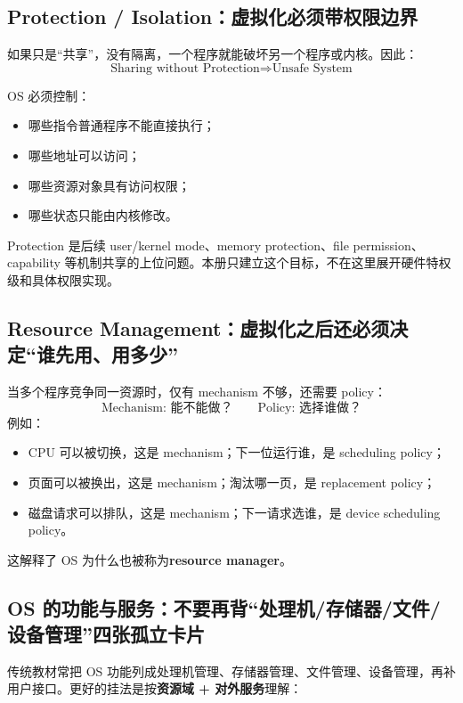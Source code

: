 \documentclass[11pt,a4paper]{ctexart}
\newcommand{\kw}[1]{\textbf{#1}}
\begin{document}
\subsection{Protection / Isolation：虚拟化必须带权限边界}

如果只是“共享”，没有隔离，一个程序就能破坏另一个程序或内核。因此：
\[
\boxed{\text{Sharing without Protection}\Rightarrow\text{Unsafe System}}
\]

OS 必须控制：
\begin{itemize}
  \item 哪些指令普通程序不能直接执行；
  \item 哪些地址可以访问；
  \item 哪些资源对象具有访问权限；
  \item 哪些状态只能由内核修改。
\end{itemize}

Protection 是后续 user/kernel mode、memory protection、file permission、capability 等机制共享的上位问题。本册只建立这个目标，不在这里展开硬件特权级和具体权限实现。

\subsection{Resource Management：虚拟化之后还必须决定“谁先用、用多少”}

当多个程序竞争同一资源时，仅有 mechanism 不够，还需要 policy：
\[
\boxed{\text{Mechanism: 能不能做？}\qquad\text{Policy: 选择谁做？}}
\]
例如：
\begin{itemize}
  \item CPU 可以被切换，这是 mechanism；下一位运行谁，是 scheduling policy；
  \item 页面可以被换出，这是 mechanism；淘汰哪一页，是 replacement policy；
  \item 磁盘请求可以排队，这是 mechanism；下一请求选谁，是 device scheduling policy。
\end{itemize}

这解释了 OS 为什么也被称为\kw{resource manager}。

\subsection{OS 的功能与服务：不要再背“处理机/存储器/文件/设备管理”四张孤立卡片}

传统教材常把 OS 功能列成处理机管理、存储器管理、文件管理、设备管理，再补用户接口。更好的挂法是按\kw{资源域 + 对外服务}理解：
\end{document}

